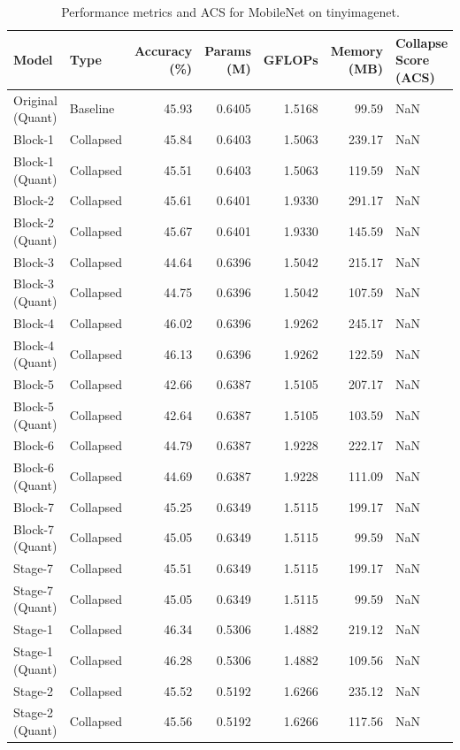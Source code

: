 \begin{table}
\caption{Performance metrics and ACS for MobileNet on tinyimagenet.}
\label{tab:MobileNet_tinyimagenet}
\begin{tabular}{llrrrrl}
\toprule
Model & Type & Accuracy (\%) & Params (M) & GFLOPs & Memory (MB) & Collapse Score (ACS) \\
\midrule
Original
(Quant) & Baseline & 45.93 & 0.6405 & 1.5168 & 99.59 & NaN \\
Block-1 & Collapsed & 45.84 & 0.6403 & 1.5063 & 239.17 & NaN \\
Block-1
(Quant) & Collapsed & 45.51 & 0.6403 & 1.5063 & 119.59 & NaN \\
Block-2 & Collapsed & 45.61 & 0.6401 & 1.9330 & 291.17 & NaN \\
Block-2
(Quant) & Collapsed & 45.67 & 0.6401 & 1.9330 & 145.59 & NaN \\
Block-3 & Collapsed & 44.64 & 0.6396 & 1.5042 & 215.17 & NaN \\
Block-3
(Quant) & Collapsed & 44.75 & 0.6396 & 1.5042 & 107.59 & NaN \\
Block-4 & Collapsed & 46.02 & 0.6396 & 1.9262 & 245.17 & NaN \\
Block-4
(Quant) & Collapsed & 46.13 & 0.6396 & 1.9262 & 122.59 & NaN \\
Block-5 & Collapsed & 42.66 & 0.6387 & 1.5105 & 207.17 & NaN \\
Block-5
(Quant) & Collapsed & 42.64 & 0.6387 & 1.5105 & 103.59 & NaN \\
Block-6 & Collapsed & 44.79 & 0.6387 & 1.9228 & 222.17 & NaN \\
Block-6
(Quant) & Collapsed & 44.69 & 0.6387 & 1.9228 & 111.09 & NaN \\
Block-7 & Collapsed & 45.25 & 0.6349 & 1.5115 & 199.17 & NaN \\
Block-7
(Quant) & Collapsed & 45.05 & 0.6349 & 1.5115 & 99.59 & NaN \\
Stage-7 & Collapsed & 45.51 & 0.6349 & 1.5115 & 199.17 & NaN \\
Stage-7
(Quant) & Collapsed & 45.05 & 0.6349 & 1.5115 & 99.59 & NaN \\
Stage-1 & Collapsed & 46.34 & 0.5306 & 1.4882 & 219.12 & NaN \\
Stage-1
(Quant) & Collapsed & 46.28 & 0.5306 & 1.4882 & 109.56 & NaN \\
Stage-2 & Collapsed & 45.52 & 0.5192 & 1.6266 & 235.12 & NaN \\
Stage-2
(Quant) & Collapsed & 45.56 & 0.5192 & 1.6266 & 117.56 & NaN \\

\end{tabular}
\end{table}
